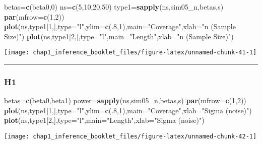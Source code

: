 \documentclass[]{article}
\newenvironment{Shaded}{\begin{snugshade}}{\end{snugshade}}
\newcommand{\KeywordTok}[1]{\textcolor[rgb]{0.13,0.29,0.53}{\textbf{#1}}}
\newcommand{\DataTypeTok}[1]{\textcolor[rgb]{0.13,0.29,0.53}{#1}}
\newcommand{\DecValTok}[1]{\textcolor[rgb]{0.00,0.00,0.81}{#1}}
\newcommand{\StringTok}[1]{\textcolor[rgb]{0.31,0.60,0.02}{#1}}
\newcommand{\NormalTok}[1]{#1}
\begin{document}
\begin{Shaded}
\begin{Highlighting}[]
\NormalTok{betas=}\KeywordTok{c}\NormalTok{(beta0,}\DecValTok{0}\NormalTok{)}
\NormalTok{ns=}\KeywordTok{c}\NormalTok{(}\DecValTok{5}\NormalTok{,}\DecValTok{10}\NormalTok{,}\DecValTok{20}\NormalTok{,}\DecValTok{50}\NormalTok{)}
\NormalTok{type1=}\KeywordTok{sapply}\NormalTok{(ns,sim05_n,betas,s)}
\KeywordTok{par}\NormalTok{(}\DataTypeTok{mfrow=}\KeywordTok{c}\NormalTok{(}\DecValTok{1}\NormalTok{,}\DecValTok{2}\NormalTok{))}
\KeywordTok{plot}\NormalTok{(ns,type1[}\DecValTok{1}\NormalTok{,],}\DataTypeTok{type=}\StringTok{"l"}\NormalTok{,}\DataTypeTok{ylim=}\KeywordTok{c}\NormalTok{(.}\DecValTok{8}\NormalTok{,}\DecValTok{1}\NormalTok{),}\DataTypeTok{main=}\StringTok{"Coverage"}\NormalTok{,}\DataTypeTok{xlab=}\StringTok{"n (Sample Size)"}\NormalTok{)}
\KeywordTok{plot}\NormalTok{(ns,type1[}\DecValTok{2}\NormalTok{,],}\DataTypeTok{type=}\StringTok{"l"}\NormalTok{,}\DataTypeTok{main=}\StringTok{"Length"}\NormalTok{,}\DataTypeTok{xlab=}\StringTok{"n (Sample Size)"}\NormalTok{)}
\end{Highlighting}
\end{Shaded}

\begin{center}\texttt{[image: chap1\_inference\_booklet\_files/figure-latex/unnamed-chunk-41-1]} \end{center}

\begin{center}\rule{0.5\linewidth}{\linethickness}\end{center}

\subsubsection{H1}\label{h1-2}

\begin{Shaded}
\begin{Highlighting}[]
\NormalTok{betas=}\KeywordTok{c}\NormalTok{(beta0,beta1)}
\NormalTok{power=}\KeywordTok{sapply}\NormalTok{(ns,sim05_n,betas,s)}
\KeywordTok{par}\NormalTok{(}\DataTypeTok{mfrow=}\KeywordTok{c}\NormalTok{(}\DecValTok{1}\NormalTok{,}\DecValTok{2}\NormalTok{))}
\KeywordTok{plot}\NormalTok{(ns,type1[}\DecValTok{1}\NormalTok{,],}\DataTypeTok{type=}\StringTok{"l"}\NormalTok{,}\DataTypeTok{ylim=}\KeywordTok{c}\NormalTok{(.}\DecValTok{8}\NormalTok{,}\DecValTok{1}\NormalTok{),}\DataTypeTok{main=}\StringTok{"Coverage"}\NormalTok{,}\DataTypeTok{xlab=}\StringTok{"Sigma (noise)"}\NormalTok{)}
\KeywordTok{plot}\NormalTok{(ns,type1[}\DecValTok{2}\NormalTok{,],}\DataTypeTok{type=}\StringTok{"l"}\NormalTok{,}\DataTypeTok{main=}\StringTok{"Length"}\NormalTok{,}\DataTypeTok{xlab=}\StringTok{"Sigma (noise)"}\NormalTok{)}
\end{Highlighting}
\end{Shaded}

\begin{center}\texttt{[image: chap1\_inference\_booklet\_files/figure-latex/unnamed-chunk-42-1]} \end{center}
\end{document}
